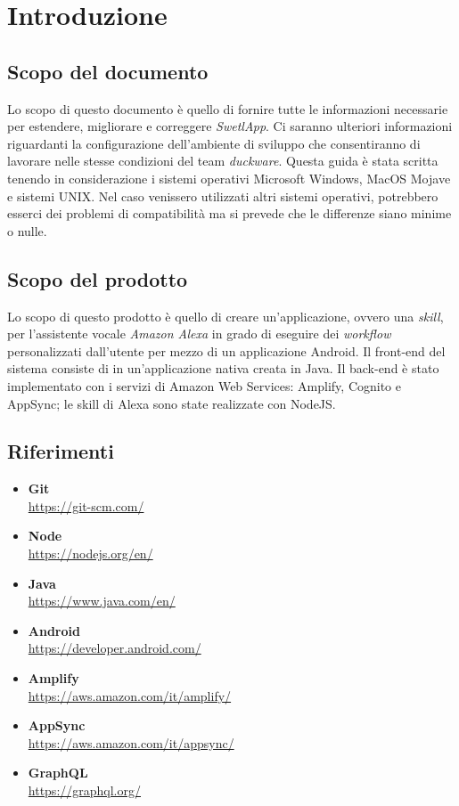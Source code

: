 \pagebreak
\section{Introduzione}
\label{sec:intro}
\subsection{Scopo del documento}
Lo scopo di questo documento è quello di fornire tutte le informazioni necessarie per estendere, migliorare e correggere \textit{SwetlApp}. Ci saranno ulteriori informazioni riguardanti la configurazione dell'ambiente di sviluppo che consentiranno di lavorare nelle stesse condizioni del team \textit{duckware}. 
Questa guida è stata scritta tenendo in considerazione i sistemi operativi Microsoft Windows, MacOS Mojave e sistemi UNIX. Nel caso venissero utilizzati altri sistemi operativi, potrebbero esserci dei problemi di compatibilità ma si prevede che le differenze siano minime o nulle.
\subsection{Scopo del prodotto}
Lo scopo di questo prodotto è quello di creare un'applicazione, ovvero una \textit{\Gls{skill}}, per l'assistente vocale \textit{\Gls{Amazon} \Gls{Alexa}} in grado di eseguire dei \textit{\gls{workflow}} personalizzati dall'utente per mezzo di un applicazione \Gls{Android}.
Il \gls{front-end} del sistema consiste di in un'applicazione nativa creata in \Gls{Java}. Il \gls{back-end} è stato implementato con i servizi di Amazon Web Services: Amplify, Cognito e AppSync; le skill di Alexa sono state realizzate con NodeJS.
\subsection{Riferimenti}
\begin{itemize}
    \item \textbf{Git}\\ \href{https://git-scm.com/}{https://git-scm.com/}
    \item \textbf{Node}\\ \href{https://nodejs.org/en/}{https://nodejs.org/en/}
    \item \textbf{Java}\\ \href{https://www.java.com/en/}{https://www.java.com/en/}
    \item \textbf{Android}\\ \href{https://developer.android.com/}{https://developer.android.com/}
    \item \textbf{Amplify}\\ \href{https://aws.amazon.com/it/amplify/}{https://aws.amazon.com/it/amplify/}
    \item \textbf{AppSync}\\ \href{https://aws.amazon.com/it/appsync/}{https://aws.amazon.com/it/appsync/}
    \item \textbf{GraphQL}\\ \href{https://graphql.org/}{https://graphql.org/}
    
\end{itemize}